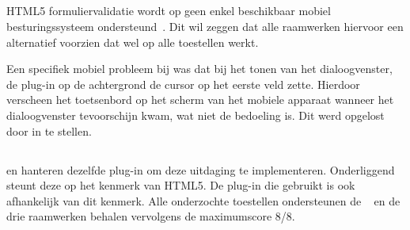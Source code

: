 \subsection{}
\label{sec:evaluatie-ondersteuning-validatie}

HTML5 formuliervalidatie wordt op geen enkel beschikbaar mobiel besturingssysteem ondersteund~\cite{Deveria2013c}.
Dit wil zeggen dat alle raamwerken hiervoor een alternatief voorzien dat wel op alle toestellen werkt.

Een specifiek mobiel probleem bij \lungo{} was dat bij het tonen van het dialoogvenster, de plug-in op de achtergrond de cursor op het eerste veld zette. 
Hierdoor verscheen het toetsenbord op het scherm van het mobiele apparaat wanneer het dialoogvenster tevoorschijn kwam, wat niet de bedoeling is. 
Dit werd opgelost door  in te stellen.

% 
% 
% 

\subsection{}
\label{sec:evaluatie-ondersteuning-handtekening}

\kendo{} en \jqm{} hanteren dezelfde plug-in om deze uitdaging te implementeren.
Onderliggend steunt deze op het  kenmerk van HTML5.
De plug-in die \st{} gebruikt is ook afhankelijk van dit kenmerk.
Alle onderzochte toestellen ondersteunen de ~\cite{Deveria2013c} en de drie raamwerken behalen vervolgens de maximumscore 8/8. 

